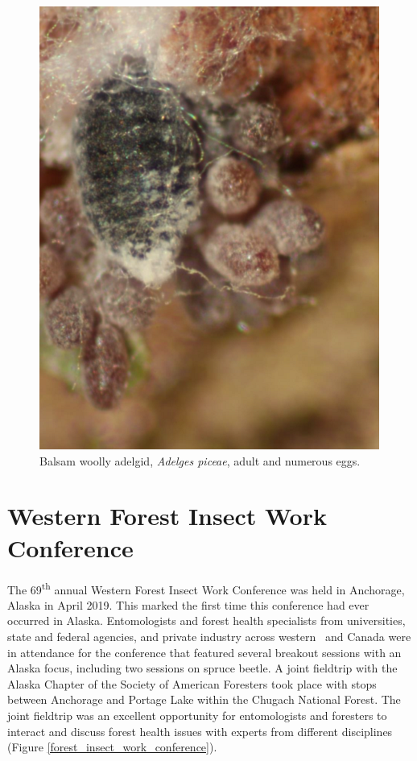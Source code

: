 \begin{figure}[H]
\begin{center}
\includegraphics[width=\textwidth]{img/balsam_woolly_adelgid_adult_eggs.png}
\caption{Balsam woolly adelgid, \textit{Adelges piceae}, adult and numerous eggs.}
\label{balsam_woolly_adelgid_adult_eggs}
\end{center}
\end{figure} 
 
\section{Western Forest Insect Work Conference}

The 69\textsuperscript{th} annual Western Forest Insect Work Conference was held in Anchorage, Alaska in April 2019. This marked the first time this conference had ever occurred in Alaska. Entomologists and forest health specialists from universities, state and federal agencies, and private industry across western \ and Canada were in attendance for the conference that featured several breakout sessions with an Alaska focus, including two sessions on spruce beetle. A joint fieldtrip with the Alaska Chapter of the Society of American Foresters took place with stops between Anchorage and Portage Lake within the Chugach National Forest. The joint fieldtrip was an excellent opportunity for entomologists and foresters to interact and discuss forest health issues with experts from different disciplines (Figure \ref{forest_insect_work_conference}).

